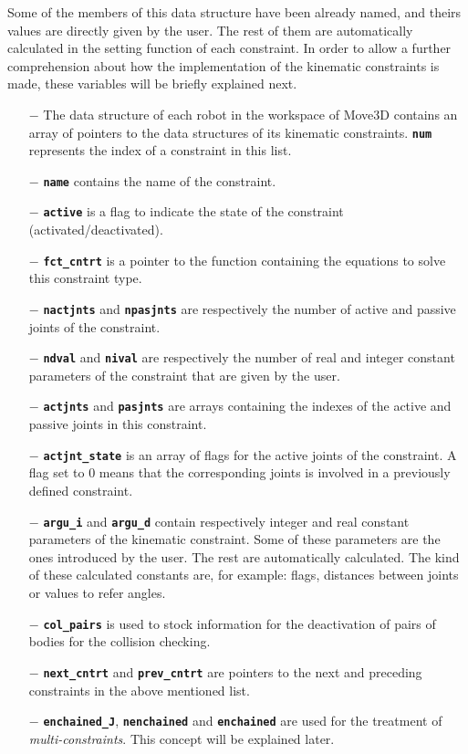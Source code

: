 Some of the members of this data structure have been already
named, and theirs values are directly given by the user. The rest
of them are automatically calculated in the setting function of each
constraint. In order to  allow a further comprehension about how the
implementation of the kinematic constraints is made, these variables
will be briefly explained next.
\begin{itemize}
\item[$-$] The data structure of each robot in the workspace of Move3D contains 
an array of pointers to the data structures of its kinematic
constraints. {\bf \tt num} represents the index of a constraint in this
list.
\item[$-$] {\bf \tt name} contains the name of the constraint.
\item[$-$] {\bf \tt active} is a flag to indicate the state of the constraint
 (activated/deactivated).
\item[$-$] {\bf \tt fct\_cntrt} is a pointer to the function
containing the equations to solve this constraint type.
\item[$-$] {\bf \tt nactjnts} and {\bf \tt npasjnts} are respectively the number
  of active and passive joints of the constraint.
\item[$-$] {\bf \tt ndval} and {\bf \tt nival} are respectively the
  number of real and integer constant parameters of the constraint
  that are given by the user.
\item[$-$] {\bf \tt actjnts} and {\bf \tt pasjnts} are arrays containing the indexes of 
the active and passive joints in this constraint.
\item[$-$] {\bf \tt actjnt\_state} is an array of flags for the active joints of
the constraint. A flag set to $0$ means that the corresponding joints
is involved in a previously defined constraint.
\item[$-$] {\bf \tt argu\_i} and {\bf \tt argu\_d} contain respectively integer and
real constant parameters of the kinematic constraint. Some of these
parameters are the ones introduced by the user. The rest are
automatically calculated. The kind of these calculated constants are, for
example: flags, distances between joints or values to refer angles.
\item[$-$] {\bf \tt col\_pairs} is used to stock information for the 
  deactivation of pairs of bodies for the collision checking.
\item[$-$] {\bf \tt next\_cntrt} and {\bf \tt prev\_cntrt} are
  pointers to the next and preceding constraints in the above
  mentioned list.
\item[$-$] {\bf \tt enchained\_J}, {\bf \tt nenchained} and {\bf \tt enchained} are used for 
  the treatment of {\em multi-constraints}. This concept will be
  explained later.
\end{itemize}


